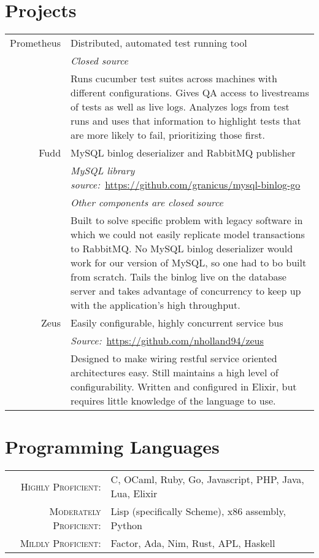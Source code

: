 \documentclass[a4paper,10pt]{article}
\begin{document}
\section{Projects}
\begin{tabular}{r|p{11cm}}
  Prometheus  & Distributed, automated test running tool\\
              & \emph{Closed source}\\
              & \footnotesize{Runs cucumber test suites across machines with different configurations. Gives QA access to livestreams of tests as well as live logs. Analyzes logs from test runs and uses that information to highlight tests that are more likely to fail, prioritizing those first.}\\
  Fudd        & MySQL binlog deserializer and RabbitMQ publisher\\
              & \emph{MySQL library source:}\ \href{https://github.com/granicus/mysql-binlog-go}{https://github.com/granicus/mysql-binlog-go}\\
              & \emph{Other components are closed source}\\
              & \footnotesize{Built to solve specific problem with legacy software in which we could not easily replicate model transactions to RabbitMQ. No MySQL binlog deserializer would work for our version of MySQL, so one had to bo built from scratch. Tails the binlog live on the database server and takes advantage of concurrency to keep up with the application's high throughput.}\\
  Zeus        & Easily configurable, highly concurrent service bus\\
              & \emph{Source:}\ \href{https://github.com/nholland94/zeus}{https://github.com/nholland94/zeus}\\
              & \footnotesize{Designed to make wiring restful service oriented architectures easy. Still maintains a high level of configurability. Written and configured in Elixir, but requires little knowledge of the language to use.}\\
\end{tabular}

\section{Programming Languages}
\begin{tabular}{rl}
  \textsc{Highly Proficient:}     & C, OCaml, Ruby, Go, Javascript, PHP, Java, Lua, Elixir\\
  \textsc{Moderately Proficient:} & Lisp (specifically Scheme), x86 assembly, Python\\
  \textsc{Mildly Proficient:}     & Factor, Ada, Nim, Rust, APL, Haskell\\
\end{tabular}
\end{document}
